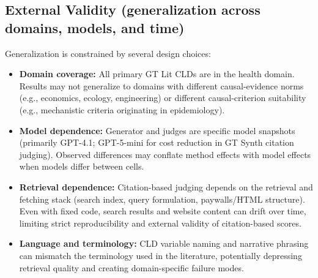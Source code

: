 \subsection{External Validity (generalization across domains, models, and time)}
Generalization is constrained by several design choices:
\begin{itemize}[noitemsep]
    \item \textbf{Domain coverage:} All primary GT Lit CLDs are in the health domain. Results may not generalize to domains with different causal-evidence norms (e.g., economics, ecology, engineering) or different causal-criterion suitability (e.g., mechanistic criteria originating in epidemiology).
    \item \textbf{Model dependence:} Generator and judges are specific model snapshots (primarily GPT-4.1; GPT-5-mini for cost reduction in GT Synth citation judging). Observed differences may conflate method effects with model effects when models differ between cells.
    \item \textbf{Retrieval dependence:} Citation-based judging depends on the retrieval and fetching stack (search index, query formulation, paywalls/HTML structure). Even with fixed code, search results and website content can drift over time, limiting strict reproducibility and external validity of citation-based scores.
    \item \textbf{Language and terminology:} CLD variable naming and narrative phrasing can mismatch the terminology used in the literature, potentially depressing retrieval quality and creating domain-specific failure modes.
\end{itemize}

